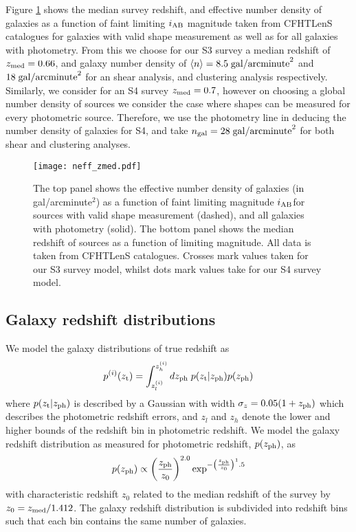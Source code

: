 \documentclass[useAMS,usenatbib,times,letter,amssymb]{mn2e}
\def\be{\begin{equation}}
\def\ee{\end{equation}}
\begin{document}
Figure \ref{Fig:CFHT_Neff_Zmed} shows the median survey redshift, and effective number density of galaxies as a function of faint limiting $i_{\rm AB}$ magnitude taken from CFHTLenS catalogues for galaxies with valid shape measurement as well as for all galaxies with photometry. From this we choose for our S3 survey a median redshift of $z_{\rm med} = 0.66$, and galaxy number density of $\langle n\rangle = 8.5 \;{\rm gal/arcminute}^2$ and $18\;{\rm gal/arcminute}^2$ for an shear analysis, and clustering analysis respectively.  Similarly, we consider for an S4 survey $z_{\rm med} = 0.7$, however on choosing a global number density of sources we consider the case where shapes can be measured for every photometric source. Therefore, we use the photometry line in deducing the number density of galaxies for S4, and take $n_{\rm gal} = 28\;{\rm gal/arcminute}^2$ for both shear and clustering analyses.  

\begin{figure}
\texttt{[image: neff\_zmed.pdf]}
\caption{The top panel shows the effective number density of galaxies (in gal/arcminute$^2$) as a function of faint limiting magnitude $i_{\rm AB} $for sources with valid shape measurement (dashed), and all galaxies with photometry (solid). The bottom panel shows the median redshift of sources as a function of limiting magnitude. All data is taken from CFHTLenS catalogues. Crosses mark values taken for our S3 survey model, whilst dots mark values take for our S4 survey model.}\label{Fig:CFHT_Neff_Zmed}
\end{figure}

\subsection{Galaxy redshift distributions}\label{Sec:Galaxy_Redshift_Distributions}

We model the galaxy distributions of true redshift as
\be
p^{(i)}(z_{\rm t}) = \int_{z^{(i)}_l}^{z^{(i)}_h} dz_{\rm ph}\; p(z_{\rm t}|z_{\rm ph})p(z_{\rm ph})
\ee
where $p(z_{\rm t}|z_{\rm ph})$ is described by a Gaussian with width $\sigma_z = 0.05(1+z_{\rm ph})$ which describes the photometric redshift errors, and $z_l$ and $z_h$ denote the lower and higher bounds of the redshift bin in photometric redshift.  We model the galaxy redshift distribution as measured for photometric redshift, $p(z_{\rm ph})$, as \citep{Smail:1994p986}
\be
p(z_{\rm ph}) \propto \left(\frac{z_{\rm ph}}{z_0}\right)^{2.0}\exp^{-\left(\frac{z_{\rm ph}}{z_0}\right)^1.5}
\ee
with characteristic redshift $z_0$ related to the median redshift of the survey by $z_0 = z_{\rm med}/1.412$. The galaxy redshift distribution is subdivided into redshift bins such that each bin contains the same number of galaxies. 
\end{document}
